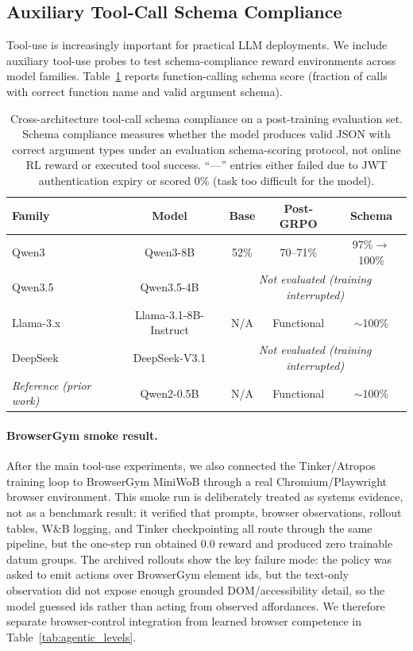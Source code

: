 \subsection{Auxiliary Tool-Call Schema Compliance}
\label{sec:tool_use_cross_arch}

Tool-use is increasingly important for practical LLM deployments. We include
auxiliary tool-use probes to test schema-compliance reward environments across
model families.
Table~\ref{tab:tool_use_cross_arch} reports function-calling schema score
(fraction of calls with correct function name and valid argument schema).

\begin{table}[htbp]
\centering
\caption{Cross-architecture tool-call schema compliance on a post-training evaluation set. Schema compliance measures whether the model produces valid JSON with correct argument types under an evaluation schema-scoring protocol, not online RL reward or executed tool success. ``---'' entries either failed due to JWT authentication expiry or scored 0\% (task too difficult for the model).}
\label{tab:tool_use_cross_arch}
\small
\begin{tabular}{@{}lcccc@{}}
\toprule
\textbf{Family} & \textbf{Model} & \textbf{Base} & \textbf{Post-GRPO} & \textbf{Schema} \\
\midrule
Qwen3 & Qwen3-8B & 52\% & 70--71\% & 97\%$\to$100\% \\
Qwen3.5 & Qwen3.5-4B & \multicolumn{3}{c}{\textit{Not evaluated (training interrupted)}} \\
Llama-3.x & Llama-3.1-8B-Instruct & N/A & Functional & $\sim$100\% \\
DeepSeek & DeepSeek-V3.1 & \multicolumn{3}{c}{\textit{Not evaluated (training interrupted)}} \\
\midrule
\textit{Reference (prior work)} & Qwen2-0.5B & N/A & Functional & $\sim$100\% \\
\bottomrule
\end{tabular}
\end{table}

\paragraph{BrowserGym smoke result.}
After the main tool-use experiments, we also connected the Tinker/Atropos
training loop to BrowserGym MiniWoB through a real Chromium/Playwright browser
environment.  This smoke run is deliberately treated as systems evidence, not
as a benchmark result: it verified that prompts, browser observations, rollout
tables, W\&B logging, and Tinker checkpointing all route through the same
pipeline, but the one-step run obtained 0.0 reward and produced zero trainable
datum groups.  The archived rollouts show the key failure mode: the policy was
asked to emit actions over BrowserGym element ids, but the text-only
observation did not expose enough grounded DOM/accessibility detail, so the
model guessed ids rather than acting from observed affordances.  We therefore
separate browser-control integration from learned browser competence in
Table~\ref{tab:agentic_levels}.

